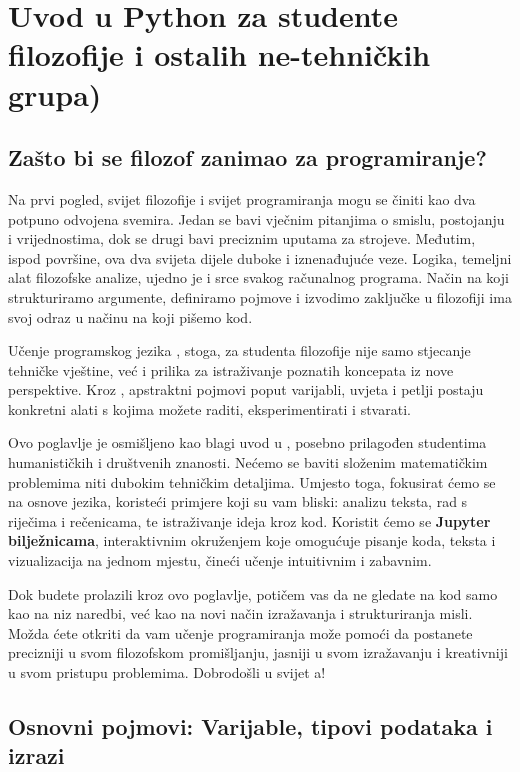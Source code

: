 
\chapter{Uvod u Python za studente filozofije i ostalih ne-tehničkih grupa)}
\label{chap:Uvod u Pzthon}

\section{Zašto bi se filozof zanimao za programiranje?}

Na prvi pogled, svijet filozofije i svijet programiranja mogu se činiti kao dva potpuno odvojena svemira. Jedan se bavi vječnim pitanjima o smislu, postojanju i vrijednostima, dok se drugi bavi preciznim uputama za strojeve. Međutim, ispod površine, ova dva svijeta dijele duboke i iznenađujuće veze. Logika, temeljni alat filozofske analize, ujedno je i srce svakog računalnog programa. Način na koji strukturiramo argumente, definiramo pojmove i izvodimo zaključke u filozofiji ima svoj odraz u načinu na koji pišemo kod.

Učenje programskog jezika , stoga, za studenta filozofije nije samo stjecanje tehničke vještine, već i prilika za istraživanje poznatih koncepata iz nove perspektive. Kroz , apstraktni pojmovi poput varijabli, uvjeta i petlji postaju konkretni alati s kojima možete raditi, eksperimentirati i stvarati.

Ovo poglavlje je osmišljeno kao blagi uvod u , posebno prilagođen studentima humanističkih i društvenih znanosti. Nećemo se baviti složenim matematičkim problemima niti dubokim tehničkim detaljima. Umjesto toga, fokusirat ćemo se na osnove jezika, koristeći primjere koji su vam bliski: analizu teksta, rad s riječima i rečenicama, te istraživanje ideja kroz kod. Koristit ćemo se \textbf{Jupyter bilježnicama}, interaktivnim okruženjem koje omogućuje pisanje koda, teksta i vizualizacija na jednom mjestu, čineći učenje intuitivnim i zabavnim.

Dok budete prolazili kroz ovo poglavlje, potičem vas da ne gledate na kod samo kao na niz naredbi, već kao na novi način izražavanja i strukturiranja misli. Možda ćete otkriti da vam učenje programiranja može pomoći da postanete precizniji u svom filozofskom promišljanju, jasniji u svom izražavanju i kreativniji u svom pristupu problemima. Dobrodošli u svijet a!

\section{Osnovni pojmovi: Varijable, tipovi podataka i izrazi}
\label{sec:osnovnipojmovi}

